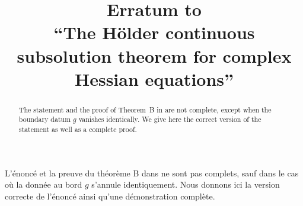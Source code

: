 \documentclass[JEP,XML,SOM,Unicode]{cedram}
\theoremstyle{definition}
\begin{document}
\frontmatter
\title[Erratum to ``The Hölder continuous subsolution theorem'']{Erratum to\\ ``The Hölder continuous subsolution theorem for complex Hessian equations''}

\author[\initial{A.} \lastname{Benali}]{ }
\address{University of Gabes, Faculty of Sciences of Gabes, LR17ES11, Mathematics and Applications\\
6072 Gabes, Tunisia}

\author[\initial{A.} \lastname{Zeriahi}]{ }
\address{Institut de Mathématiques de Toulouse, Université de Toulouse, CNRS, UPS\\
118 route de Narbonne, 31062 Toulouse cedex 09, France}



\begin{abstract}
The statement and the proof of Theorem~B in  are not complete, except when the boundary datum $g$ vanishes identically. We give here the correct version of the statement as well as a complete proof.
\end{abstract}


\begin{altabstract}
L'énoncé et la preuve du théorème B dans  ne sont pas complets, sauf dans le cas où la donnée au bord $g$ s'annule identiquement. Nous donnons ici la version correcte de l'énoncé ainsi qu'une démonstration complète.
\end{altabstract}

\maketitle

\tableofcontents
\mainmatter
\end{document}
